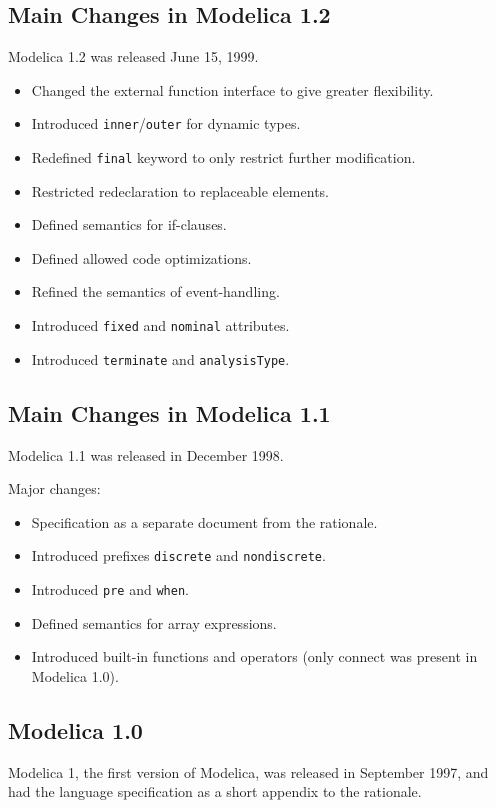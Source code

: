 \subsection{Main Changes in Modelica 1.2}\label{main-changes-in-modelica-1-2}

Modelica 1.2 was released June 15, 1999.
\begin{itemize}
\item
  Changed the external function interface to give greater flexibility.
\item
  Introduced \lstinline!inner!/\lstinline!outer! for dynamic types.
\item
  Redefined \lstinline!final! keyword to only restrict further
  modification.
\item
  Restricted redeclaration to replaceable elements.
\item
  Defined semantics for if-clauses.
\item
  Defined allowed code optimizations.
\item
  Refined the semantics of event-handling.
\item
  Introduced \lstinline!fixed! and \lstinline!nominal! attributes.
\item
  Introduced \lstinline!terminate! and \lstinline!analysisType!.
\end{itemize}

\subsection{Main Changes in Modelica 1.1}\label{main-changes-in-modelica-1-1}
Modelica 1.1 was released in December 1998.

Major changes:
\begin{itemize}
\item
  Specification as a separate document from the rationale.
\item
  Introduced prefixes \lstinline!discrete! and \lstinline!nondiscrete!.
\item
  Introduced \lstinline!pre! and \lstinline!when!.
\item
  Defined semantics for array expressions.
\item
  Introduced built-in functions and operators (only connect was present in Modelica 1.0).
\end{itemize}

\subsection{Modelica 1.0}\label{modelica-1-0}

Modelica 1, the first version of Modelica, was released in September
1997, and had the language specification as a short appendix to the
rationale.
